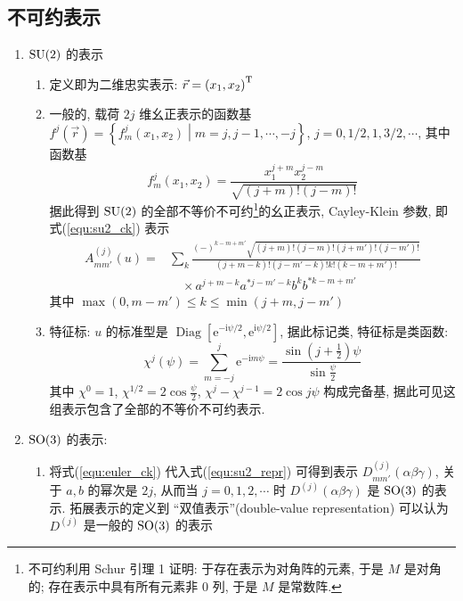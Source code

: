 \documentclass[12pt,a4paper]{article}%
\numberwithin{equation}{section}%
\newcommand\mi{\mathrm{i}}
\newcommand\e{\mathrm{e}}%
\DeclareMathOperator\diag{Diag}
\begin{document}
\subsection{不可约表示} %
\label{sub:repr}
\begin{enumerate}
	\item $\mathrm{SU}(2)$ 的表示
	\begin{enumerate}
		\item 定义即为二维忠实表示: $\vec r = \left(x_1, x_2\right)^\mathrm{T}$
		\item 一般的, 载荷 $2j$ 维幺正表示的函数基 $f^j(\vec r) = \left\{f_m^j(x_1,x_2)\middle | m = j, j-1, \cdots, -j\right\}$, $j = 0, 1/2, 1, 3/2,\cdots$, 其中函数基
		\begin{equation}\label{equ:su2_func_base}
			f_m^j(x_1, x_2) = \frac{x_1^{j+m}x_2^{j-m}}{\sqrt{(j+m)!(j-m)!}}
		\end{equation}
		据此得到 $\mathrm{SU}(2)$ 的全部不等价不可约\footnote{不可约利用 Schur 引理 1 证明: 于存在表示为对角阵的元素, 于是 $M$ 是对角的; 存在表示中具有所有元素非 $0$ 列, 于是 $M$ 是常数阵.}的幺正表示, Cayley-Klein 参数, 即式(\ref{equ:su2_ck}) 表示
		\begin{equation}\label{equ:su2_repr}
		\begin{split}
			A^{(j)}_{mm'}(u) =& \sum_k\frac{(-)^{k-m+m'}\sqrt{(j+m)!(j-m)!(j+m')!(j-m')!}}{(j+m-k)!(j-m'-k)!k!(k-m+m')!}\\
			&\quad\times a^{j+m-k}a^{*j-m'-k}b^kb^{*k-m+m'}
		\end{split}
		\end{equation}
		其中 $\max (0,m-m')\le k \le \min (j+m, j-m')$
		\item 特征标: $u$ 的标准型是 $\diag[\e^{-\mi\psi/2},\e^{\mi\psi/2}]$, 据此标记类, 特征标是类函数: 
		\begin{equation}\label{equ:chi_for_so}
			\chi^j(\psi) = \sum_{m=-j}^j\e^{-\mi m\psi} = \frac{\sin(j+\frac 12)\psi}{\sin\frac\psi 2}
		\end{equation}
		其中 $\chi^0 = 1$, $\chi^{1/2} = 2\cos\frac\psi 2$, $\chi^j - \chi^{j-1} = 2\cos j\psi$ 构成完备基, 据此可见这组表示包含了全部的不等价不可约表示.
	\end{enumerate}
	\item $\mathrm{SO}(3)$ 的表示: 
	\begin{enumerate}
		\item 将式(\ref{equ:euler_ck}) 代入式(\ref{equ:su2_repr}) 可得到表示 $D^{(j)}_{mm'}(\alpha\beta\gamma)$, 关于 $a,b$ 的幂次是 $2j$, 从而当 $j = 0,1,2,\cdots$ 时 $D^{(j)}(\alpha\beta\gamma)$ 是 $\mathrm{SO}(3)$ 的表示. 拓展表示的定义到 ``双值表示''(double-value representation) 可以认为 $D^{(j)}$ 是一般的 $\mathrm{SO}(3)$ 的表示

\end{enumerate}
\end{enumerate}
\end{document}
